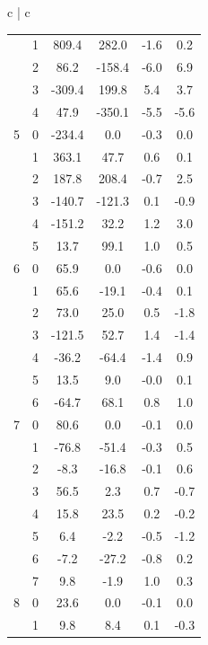 \documentclass[11pt,dvipsnames]{thesis}
\begin{document}
\begin{table}[H]
{\begin{tabular}{c | c}
\begin{tabular}{cc S[table-format=-5.1] S[table-format=-4.1] S[table-format=-2.1] S[table-format=-2.1]}
   &  1&     809.4&     282.0&       -1.6&        0.2 \\
   &  2&      86.2&    -158.4&       -6.0&        6.9 \\
   &  3&    -309.4&     199.8&        5.4&        3.7 \\
   &  4&      47.9&    -350.1&       -5.5&       -5.6 \\
5  &  0&    -234.4&       0.0&       -0.3&        0.0 \\
   &  1&     363.1&      47.7&        0.6&        0.1 \\
   &  2&     187.8&     208.4&       -0.7&        2.5 \\
   &  3&    -140.7&    -121.3&        0.1&       -0.9 \\
   &  4&    -151.2&      32.2&        1.2&        3.0 \\
   &  5&      13.7&      99.1&        1.0&        0.5 \\
6  &  0&      65.9&       0.0&       -0.6&        0.0 \\
   &  1&      65.6&     -19.1&       -0.4&        0.1 \\
   &  2&      73.0&      25.0&        0.5&       -1.8 \\
   &  3&    -121.5&      52.7&        1.4&       -1.4 \\
   &  4&     -36.2&     -64.4&       -1.4&        0.9 \\
   &  5&      13.5&       9.0&       -0.0&        0.1 \\
   &  6&     -64.7&      68.1&        0.8&        1.0 \\
7  &  0&      80.6&       0.0&       -0.1&        0.0 \\
   &  1&     -76.8&     -51.4&       -0.3&        0.5 \\
   &  2&      -8.3&     -16.8&       -0.1&        0.6 \\
   &  3&      56.5&       2.3&        0.7&       -0.7 \\
   &  4&      15.8&      23.5&        0.2&       -0.2 \\
   &  5&       6.4&      -2.2&       -0.5&       -1.2 \\
   &  6&      -7.2&     -27.2&       -0.8&        0.2 \\
   &  7&       9.8&      -1.9&        1.0&        0.3 \\
8  &  0&      23.6&       0.0&       -0.1&        0.0 \\
   &  1&       9.8&       8.4&        0.1&       -0.3 \\

\end{tabular}
\end{tabular}}
\end{table}
\end{document}
